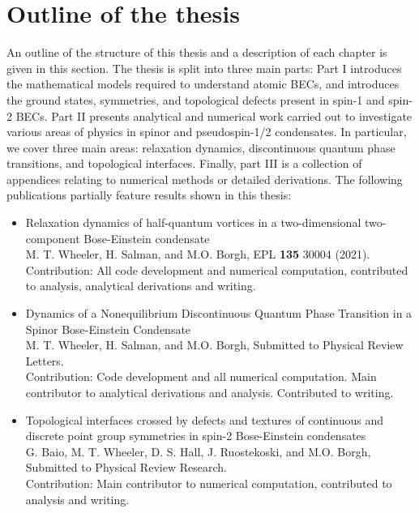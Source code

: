 \section{Outline of the thesis}
An outline of the structure of this thesis and a description of each chapter is
given in this section.
The thesis is split into three main parts: Part I introduces the mathematical
models required to understand atomic BECs, and introduces the ground states,
symmetries, and topological defects present in spin-1 and spin-2 BECs.
Part II presents analytical and numerical work carried out to investigate
various areas of physics in spinor and pseudospin-1/2 condensates.
In particular, we cover three main areas: relaxation dynamics, discontinuous
quantum phase transitions, and topological interfaces.
Finally, part III is a collection of appendices relating to numerical methods
or detailed derivations.
The following publications partially feature results shown in this thesis:
\begin{itemize}
    \item Relaxation dynamics of half-quantum vortices in a two-dimensional
          two-component Bose-Einstein condensate\\
          {\small M. T. Wheeler, H. Salman, and M.O. Borgh, EPL \textbf{135}
          30004 (2021).} \\
          Contribution: All code development and numerical computation,
          contributed to analysis, analytical derivations and writing.

    \item Dynamics of a Nonequilibrium  Discontinuous Quantum Phase Transition
            in a Spinor Bose-Einstein Condensate\\
          {\small M. T. Wheeler, H. Salman, and M.O. Borgh, Submitted to
          Physical Review Letters.} \\
          Contribution: Code development and all numerical computation.
          Main contributor to analytical derivations and analysis.
          Contributed to writing.

    \item Topological interfaces crossed by defects and textures of continuous
            and discrete point group symmetries in spin-2 Bose-Einstein
            condensates\\
          {\small G. Baio, M. T. Wheeler, D. S. Hall, J. Ruostekoski, and M.O.
          Borgh, Submitted to Physical Review Research.} \\
          Contribution: Main contributor to numerical computation, contributed
          to analysis and writing.
\end{itemize}

